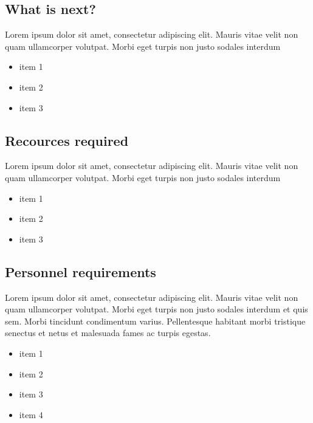 \documentclass[11pt,a4paper,titlepage]{article}
\begin{document}
\subsection{What is next?}
Lorem ipsum dolor sit amet, consectetur adipiscing elit. Mauris vitae velit 
non quam ullamcorper volutpat. Morbi eget turpis non justo sodales interdum
\newline
\begin{itemize}
\item item 1
\item item 2
\item item 3
\end{itemize}
 
\subsection{Recources required}
Lorem ipsum dolor sit amet, consectetur adipiscing elit. Mauris vitae velit 
non quam ullamcorper volutpat. Morbi eget turpis non justo sodales interdum
\newline
\begin{itemize}
\item item 1
\item item 2
\item item 3
\end{itemize}

\subsection{Personnel requirements}
Lorem ipsum dolor sit amet, consectetur adipiscing elit. Mauris vitae velit 
non quam ullamcorper volutpat. Morbi eget turpis non justo sodales interdum 
et quis sem. Morbi tincidunt condimentum varius. Pellentesque habitant morbi 
tristique senectus et netus et malesuada fames ac turpis egestas.\newline
\begin{itemize}
\item item 1
\item item 2
\item item 3
\item item 4
\end{itemize}
\end{document}
